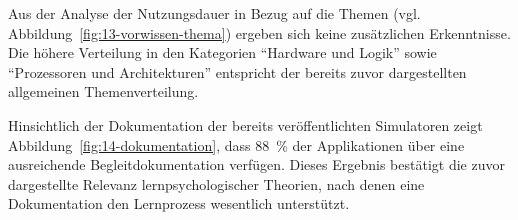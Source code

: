 Aus der Analyse der Nutzungsdauer in Bezug auf die Themen (vgl. Abbildung~\ref{fig:13-vorwissen-thema}) ergeben sich keine zusätzlichen Erkenntnisse. Die höhere Verteilung in den Kategorien \enquote{Hardware und Logik} sowie \enquote{Prozessoren und Architekturen} entspricht der bereits zuvor dargestellten allgemeinen Themenverteilung.

Hinsichtlich der Dokumentation der bereits veröffentlichten Simulatoren zeigt Abbildung~\ref{fig:14-dokumentation}, dass 88~\% der Applikationen über eine ausreichende Begleitdokumentation verfügen. Dieses Ergebnis bestätigt die zuvor dargestellte Relevanz lernpsychologischer Theorien, nach denen eine Dokumentation den Lernprozess wesentlich unterstützt.

